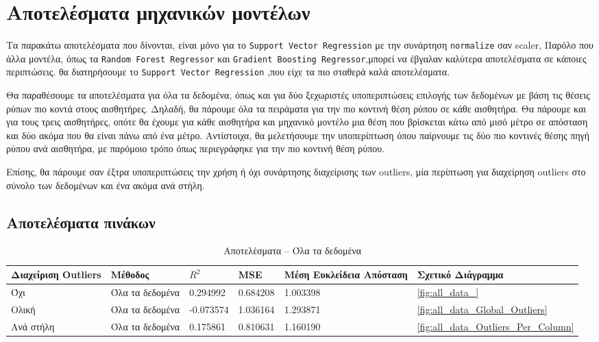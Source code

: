 \section{Αποτελέσματα μηχανικών μοντέλων}

Τα παρακάτω αποτελέσματα που δίνονται, είναι μόνο για το \texttt{Support Vector Regression} με την συνάρτηση \texttt{normalize} σαν scaler, 
Παρόλο που άλλα μοντέλα, όπως τα \texttt{Random Forest Regressor} και \texttt{Gradient \linebreak Boosting Regressor},μπορεί να έβγαλαν καλύτερα αποτελέσματα σε κάποιες περιπτώσεις.
θα διατηρήσουμε το \texttt{Support Vector Regression} ,που είχε τα πιο σταθερά καλά αποτελέσματα. 

Θα παραθέσουμε τα αποτελέσματα για όλα τα δεδομένα, όπως και για δύο ξεχωριστές υποπεριπτώσεις επιλογής των δεδομένων με βάση τις θέσεις ρύπων πιο κοντά στους αισθητήρες.
Δηλαδή, θα πάρουμε όλα τα πειράματα για την πιο κοντινή θέση ρύπου σε κάθε αισθητήρα. Θα πάρουμε και για τους τρεις αισθητήρες, οπότε θα έχουμε για κάθε αισθητήρα και μηχανικό μοντέλο 
μια θέση που βρίσκεται κάτω από μισό μέτρο σε απόσταση και δύο ακόμα που θα είναι πάνω από ένα μέτρο.
Αντίστοιχα, θα μελετήσουμε την υποπερίπτωση όπου παίρνουμε τις δύο πιο κοντινές θέσης πηγή ρύπου ανά αισθητήρα, με παρόμοιο τρόπο όπως περιεγράφηκε για την πιο κοντινή θέση ρύπου.

Επίσης, θα πάρουμε σαν έξτρα υποπεριπτώσεις την χρήση ή όχι συνάρτησης διαχείρισης των outliers, μία περίπτωση για διαχείρηση outliers στο σύνολο των δεδομένων και ένα ακόμα ανά στήλη.



\subsection{Αποτελέσματα πινάκων}

\setlength{\tabcolsep}{4pt}

\begin{table}[h!]
\centering
\caption{Αποτελέσματα – Όλα τα δεδομένα}
\label{tab:all_data}
\begin{tabularx}{\textwidth}{|
    >{\raggedright\arraybackslash}p{3cm} |
    >{\raggedright\arraybackslash}p{3cm} |
    X | X | X | X |}
\hline
\toprule
\textbf{Διαχείριση Outliers} & 
\textbf{Μέθοδος} &
\textbf{$R^2$} &
\textbf{MSE} &
\textbf{Μέση Ευκλείδεια Απόσταση} &
\textbf{Σχετικό Διάγραμμα} \\
\midrule
Όχι        & Όλα τα δεδομένα & 0.294992  & 0.684208  & 1.003398 & \autoref{fig:all_data_} \\
Ολική      & Όλα τα δεδομένα & -0.073574 & 1.036164  & 1.293871 & \autoref{fig:all_data_Global_Outliers} \\
Ανά στήλη  & Όλα τα δεδομένα & 0.175861  & 0.810631  & 1.160190 & \autoref{fig:all_data_Outliers_Per_Column} \\
\bottomrule
\end{tabularx}
\end{table}

